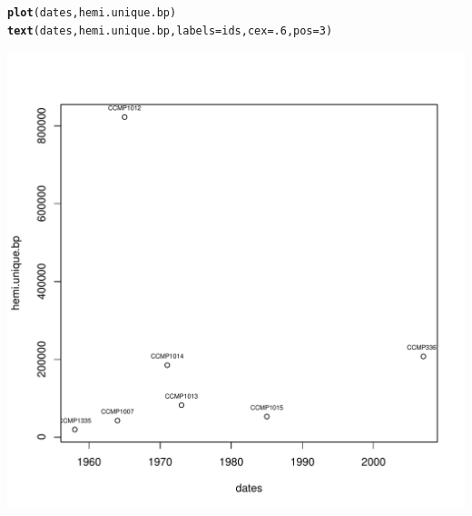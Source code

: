 \documentclass{article}\usepackage[]{graphicx}\usepackage[]{color}
\makeatletter
\def\maxwidth{ %
  \ifdim\Gin@nat@width>\linewidth
    \linewidth
  \else
    \Gin@nat@width
  \fi
}
\newcommand{\hlnum}[1]{\textcolor[rgb]{0.686,0.059,0.569}{#1}}%
\newcommand{\hlstd}[1]{\textcolor[rgb]{0.345,0.345,0.345}{#1}}%
\newcommand{\hlkwc}[1]{\textcolor[rgb]{0.333,0.667,0.333}{#1}}%
\newcommand{\hlkwd}[1]{\textcolor[rgb]{0.737,0.353,0.396}{\textbf{#1}}}%
\newenvironment{kframe}{%
 \def\at@end@of@kframe{}%
 \ifinner\ifhmode%
  \def\at@end@of@kframe{\end{minipage}}%
  \begin{minipage}{\columnwidth}%
 \fi\fi%
 \def\FrameCommand##1{\hskip\@totalleftmargin \hskip-\fboxsep
 \colorbox{shadecolor}{##1}\hskip-\fboxsep
     \hskip-\linewidth \hskip-\@totalleftmargin \hskip\columnwidth}%
 \MakeFramed {\advance\hsize-\width
   \@totalleftmargin\z@ \linewidth\hsize
   \@setminipage}}%
 {\par\unskip\endMakeFramed%
 \at@end@of@kframe}
\newenvironment{knitrout}{}{} %
\makeatother
\begin{document}
\begin{knitrout}\footnotesize
{}\color{fgcolor}\begin{kframe}
\begin{alltt}
\hlkwd{plot}\hlstd{(dates,hemi.unique.bp)}
\hlkwd{text}\hlstd{(dates,hemi.unique.bp,}\hlkwc{labels}\hlstd{=ids,}\hlkwc{cex}\hlstd{=}\hlnum{.6}\hlstd{,}\hlkwc{pos}\hlstd{=}\hlnum{3}\hlstd{)}
\end{alltt}
\end{kframe}

{\centering \includegraphics[width=\maxwidth]{figs-knitr/unnamed-chunk-62-1} 

}



\end{knitrout}
\end{document}
